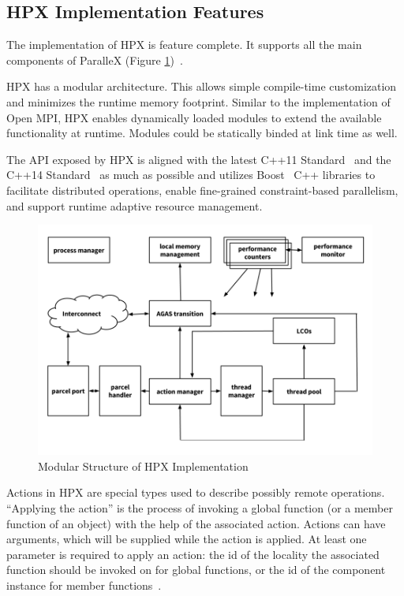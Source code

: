 \subsection{HPX Implementation Features}

The implementation of HPX is feature complete. It supports all the main components of ParalleX (Figure \ref{fig:hpx-structure})~\cite{anderson2013tabulated}.

HPX has a modular architecture. This allows simple compile-time customization and minimizes the runtime memory footprint. Similar to the implementation of Open MPI, HPX enables dynamically loaded modules to extend the available functionality at runtime. Modules could be statically binded at link time as well.

The API exposed by HPX is aligned with the latest C++11 Standard~\cite{c++11} and the C++14 Standard~\cite{c++14} as much as possible and utilizes Boost~\cite{dawes2009boost} C++ libraries to facilitate distributed operations, enable fine-grained constraint-based parallelism, and support runtime adaptive resource management\cite{kaiser2014hpx}.

\begin{figure}[ht]
\centering
\includegraphics[scale=0.47]{images/hpx.png}
\caption[Modular Structure of HPX Implementation]{Modular Structure of HPX Implementation}
\label{fig:hpx-structure}
\end{figure}

Actions in HPX are special types used to describe possibly remote operations. ``Applying the action'' is the process of invoking a global function (or a member function of an object) with the help of the associated action. Actions can have arguments, which will be supplied while the action is applied. At least one parameter is required to apply an action: the id of the locality the associated function should be invoked on for global functions, or the id of the component instance for member functions~\cite{ghimire2014data}.

